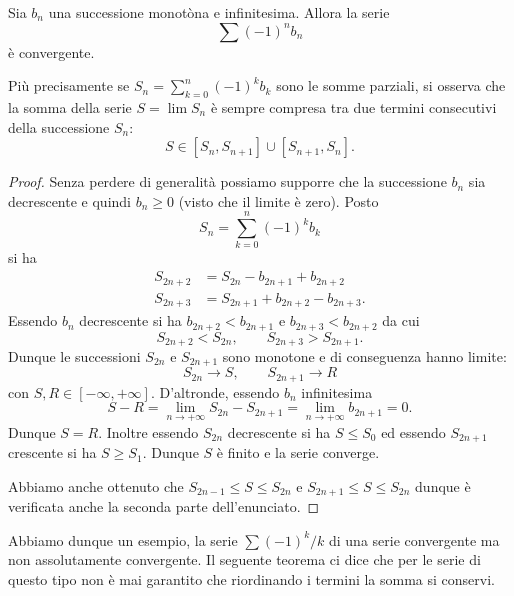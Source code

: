 \begin{theorem}
\label{th:Leibniz}
\mymark{***}
Sia $b_n$ una successione monotòna e infinitesima. Allora
la serie
\[
  \sum (-1)^{n} b_n
\]
è convergente.

Più precisamente se $\displaystyle S_n = \sum_{k=0}^n (-1)^k b_k$
sono le somme parziali,
si osserva che la somma della serie $S= \lim S_n$ è sempre compresa
tra due termini consecutivi della successione $S_n$:
\[
  S \in [S_n, S_{n+1}] \cup [S_{n+1}, S_n].
\]
\end{theorem}
%
\begin{proof}
\mymark{***}
Senza perdere di generalità possiamo supporre che la successione $b_n$ sia decrescente e quindi $b_n \ge 0$ (visto che il limite è zero).
Posto
\[
 S_n = \sum_{k=0}^n (-1)^k b_k
\]
si ha
\begin{align*}
  S_{2n+2} &= S_{2n} - b_{2n+1} + b_{2n+2} \\
  S_{2n+3} &= S_{2n+1} + b_{2n+2} - b_{2n+3}.
\end{align*}
Essendo $b_n$ decrescente si ha $b_{2n+2} < b_{2n+1}$ e $b_{2n+3} < b_{2n+2}$ da cui
\[
  S_{2n+2} < S_{2n}, \qquad S_{2n+3} > S_{2n+1}.
\]
Dunque le successioni $S_{2n}$ e $S_{2n+1}$ sono monotone e di conseguenza
hanno limite:
\[
  S_{2n} \to S, \qquad S_{2n+1} \to R
\]
con $S, R  \in [-\infty, +\infty]$.
D'altronde, essendo $b_n$ infinitesima
\[
  S - R
  = \lim_{n\to +\infty} S_{2n} - S_{2n+1}
  = \lim_{n\to +\infty} b_{2n+1} = 0.
\]
Dunque $S=R$. Inoltre essendo $S_{2n}$ decrescente si ha
$S \le S_0$ ed essendo $S_{2n+1}$ crescente si ha $S\ge S_1$.
Dunque $S$ è finito e la serie converge.

Abbiamo anche ottenuto che
$S_{2n-1} \le S \le S_{2n}$ e $S_{2n+1} \le S \le S_{2n}$
dunque è verificata anche la seconda parte dell'enunciato.
\end{proof}

Abbiamo dunque un esempio, la serie $\sum (-1)^k / k$ di una serie convergente ma non assolutamente convergente.
Il seguente teorema ci dice che per le serie di questo tipo non è mai garantito che riordinando i termini la somma si conservi.

